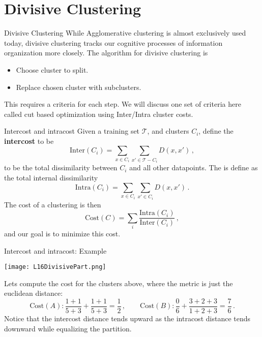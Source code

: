 \documentclass[10pt, table, dvipsnames,xcdraw, handout]{beamer}
\newcommand{\cT}{\ensuremath{\mathcal{T}}}
\begin{document}
\section{Divisive Clustering}



\begin{frame}[fragile]{Divisive Clustering}
While Agglomerative clustering is almost exclusively used today, divisive clustering tracks our cognitive processes of information organization more closely. \pause The algorithm for divisive clustering is
\begin{itemize}
\item[] Choose cluster to split.\pause
\item[] Replace chosen cluster with subclusters.\pause
\end{itemize}
This requires a criteria for each step. We will discuss one set of criteria here called cut based optimization using Inter/Intra cluster costs.
\end{frame}



\begin{frame}[fragile]{Intercost and intracost}
Given a training set $\mathcal{T}$, and clusters $C_i$, define the \textbf{intercost} to be
$$
\text{Inter}(C_i) = \sum_{x\in C_i}\sum_{x'\in \cT - C_i} D(x,x')\,, 
$$
to be the total dissimilarity between $C_i$ and all other datapoints. \pause The  is define as the total internal dissimilarity
$$
\text{Intra}(C_i) = \sum_{x\in C_i}\sum_{x'\in C_i} D(x,x')\,.
$$\pause
The cost of a clustering is then
$$
\text{Cost}(C) = \sum_{i}\frac{\text{Intra}(C_i)}{\text{Inter}(C_i) }\,,
$$\pause
and our goal is to minimize this cost. 
\end{frame}



\begin{frame}[fragile]{Intercost and intracost: Example}
  \begin{minipage}[t][0.5\textheight][t]{\textwidth}
	\centering \texttt{[image: L16DivisivePart.png]}
  \end{minipage}
  \vfill
\begin{minipage}[t][0.5\textheight][t]{\textwidth}
Lets compute the cost for the clusters above, where the metric is just the euclidean distance:\pause
$$
\text{Cost}(A): \frac{1 +1}{5 + 3} + \frac{1 +1}{5 + 3}  = \frac12\,,\hspace{2em}
\text{Cost}(B): \frac{0}{6} + \frac{3 + 2 + 3}{1 + 2 + 3}  = \frac76\,.
$$ \pause
Notice that the intercost distance tends upward as the intracost distance tends downward while equalizing the partition. 
\end{minipage}
\end{frame}
\end{document}
